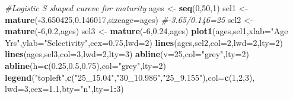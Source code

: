 \documentclass[
  lang=cn,
  11pt,
  scheme=chinese,
  chinesefont=nofont,
  citestyle=gb7714-2015,
  bibstyle=gb7714-2015]{elegantbook}
\newenvironment{Shaded}{\begin{snugshade}}{\end{snugshade}}
\newcommand{\AttributeTok}[1]{\textcolor[rgb]{0.13,0.29,0.53}{#1}}
\newcommand{\CommentTok}[1]{\textcolor[rgb]{0.56,0.35,0.01}{\textit{#1}}}
\newcommand{\DecValTok}[1]{\textcolor[rgb]{0.00,0.00,0.81}{#1}}
\newcommand{\FloatTok}[1]{\textcolor[rgb]{0.00,0.00,0.81}{#1}}
\newcommand{\FunctionTok}[1]{\textcolor[rgb]{0.13,0.29,0.53}{\textbf{#1}}}
\newcommand{\NormalTok}[1]{#1}
\newcommand{\OtherTok}[1]{\textcolor[rgb]{0.56,0.35,0.01}{#1}}
\newcommand{\SpecialCharTok}[1]{\textcolor[rgb]{0.81,0.36,0.00}{\textbf{#1}}}
\newcommand{\StringTok}[1]{\textcolor[rgb]{0.31,0.60,0.02}{#1}}
\begin{document}
\begin{Shaded}
\begin{Highlighting}[]
 \CommentTok{\#Logistic S shaped cureve for maturity  }
\NormalTok{ages }\OtherTok{\textless{}{-}} \FunctionTok{seq}\NormalTok{(}\DecValTok{0}\NormalTok{,}\DecValTok{50}\NormalTok{,}\DecValTok{1}\NormalTok{)  }
\NormalTok{sel1 }\OtherTok{\textless{}{-}} \FunctionTok{mature}\NormalTok{(}\SpecialCharTok{{-}}\FloatTok{3.650425}\NormalTok{,}\FloatTok{0.146017}\NormalTok{,}\AttributeTok{sizeage=}\NormalTok{ages) }\CommentTok{\#{-}3.65/0.146=25  }
\NormalTok{sel2 }\OtherTok{\textless{}{-}} \FunctionTok{mature}\NormalTok{(}\SpecialCharTok{{-}}\DecValTok{6}\NormalTok{,}\FloatTok{0.2}\NormalTok{,ages)  }
\NormalTok{sel3 }\OtherTok{\textless{}{-}} \FunctionTok{mature}\NormalTok{(}\SpecialCharTok{{-}}\DecValTok{6}\NormalTok{,}\FloatTok{0.24}\NormalTok{,ages)  }
\FunctionTok{plot1}\NormalTok{(ages,sel1,}\AttributeTok{xlab=}\StringTok{"Age Yrs"}\NormalTok{,}\AttributeTok{ylab=}\StringTok{"Selectivity"}\NormalTok{,}\AttributeTok{cex=}\FloatTok{0.75}\NormalTok{,}\AttributeTok{lwd=}\DecValTok{2}\NormalTok{)  }
\FunctionTok{lines}\NormalTok{(ages,sel2,}\AttributeTok{col=}\DecValTok{2}\NormalTok{,}\AttributeTok{lwd=}\DecValTok{2}\NormalTok{,}\AttributeTok{lty=}\DecValTok{2}\NormalTok{)  }
\FunctionTok{lines}\NormalTok{(ages,sel3,}\AttributeTok{col=}\DecValTok{3}\NormalTok{,}\AttributeTok{lwd=}\DecValTok{2}\NormalTok{,}\AttributeTok{lty=}\DecValTok{3}\NormalTok{)  }
\FunctionTok{abline}\NormalTok{(}\AttributeTok{v=}\DecValTok{25}\NormalTok{,}\AttributeTok{col=}\StringTok{"grey"}\NormalTok{,}\AttributeTok{lty=}\DecValTok{2}\NormalTok{)   }
\FunctionTok{abline}\NormalTok{(}\AttributeTok{h=}\FunctionTok{c}\NormalTok{(}\FloatTok{0.25}\NormalTok{,}\FloatTok{0.5}\NormalTok{,}\FloatTok{0.75}\NormalTok{),}\AttributeTok{col=}\StringTok{"grey"}\NormalTok{,}\AttributeTok{lty=}\DecValTok{2}\NormalTok{)  }
\FunctionTok{legend}\NormalTok{(}\StringTok{"topleft"}\NormalTok{,}\FunctionTok{c}\NormalTok{(}\StringTok{"25\_15.04"}\NormalTok{,}\StringTok{"30\_10.986"}\NormalTok{,}\StringTok{"25\_9.155"}\NormalTok{),}\AttributeTok{col=}\FunctionTok{c}\NormalTok{(}\DecValTok{1}\NormalTok{,}\DecValTok{2}\NormalTok{,}\DecValTok{3}\NormalTok{),  }
       \AttributeTok{lwd=}\DecValTok{3}\NormalTok{,}\AttributeTok{cex=}\FloatTok{1.1}\NormalTok{,}\AttributeTok{bty=}\StringTok{"n"}\NormalTok{,}\AttributeTok{lty=}\DecValTok{1}\SpecialCharTok{:}\DecValTok{3}\NormalTok{)  }
\end{Highlighting}
\end{Shaded}
\end{document}
